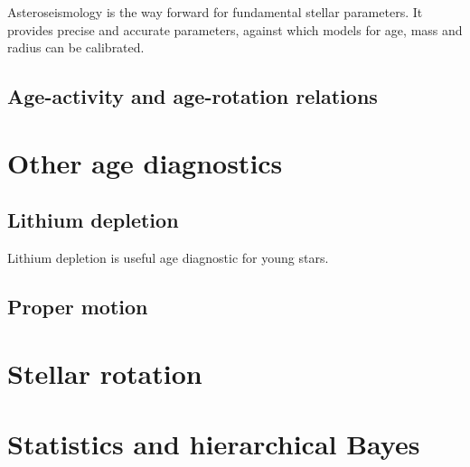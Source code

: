 Asteroseismology is the way forward for fundamental stellar parameters.
It provides precise and accurate parameters, against which models for age,
mass and radius can be calibrated.

\subsection{Age-activity and age-rotation relations}



\section{Other age diagnostics}

\subsection{Lithium depletion}
Lithium depletion is useful age diagnostic for young stars.

\subsection{Proper motion}

\section{Stellar rotation}

\section{Statistics and hierarchical Bayes}
